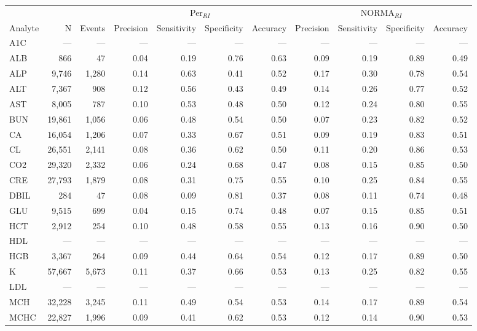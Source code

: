 \begin{table}[ht]
\centering
\footnotesize
\begin{tabular}{lrrrrrrrrrr}
\toprule
 & &  & \multicolumn{4}{c}{Per$_{RI}$} & \multicolumn{4}{c}{NORMA$_{RI}$} \\
\cmidrule(lr){4-7} \cmidrule(lr){8-11}
Analyte & N & Events & Precision & Sensitivity & Specificity & Accuracy & Precision & Sensitivity & Specificity & Accuracy \\
\midrule
A1C & --- & --- & --- & --- & --- & --- & --- & --- & --- & --- \\
ALB & 866 & 47 & 0.04 & 0.19 & 0.76 & 0.63 & 0.09 & 0.19 & 0.89 & 0.49 \\
ALP & 9,746 & 1,280 & 0.14 & 0.63 & 0.41 & 0.52 & 0.17 & 0.30 & 0.78 & 0.54 \\
ALT & 7,367 & 908 & 0.12 & 0.56 & 0.43 & 0.49 & 0.14 & 0.26 & 0.77 & 0.52 \\
AST & 8,005 & 787 & 0.10 & 0.53 & 0.48 & 0.50 & 0.12 & 0.24 & 0.80 & 0.55 \\
BUN & 19,861 & 1,056 & 0.06 & 0.48 & 0.54 & 0.50 & 0.07 & 0.23 & 0.82 & 0.52 \\
CA & 16,054 & 1,206 & 0.07 & 0.33 & 0.67 & 0.51 & 0.09 & 0.19 & 0.83 & 0.51 \\
CL & 26,551 & 2,141 & 0.08 & 0.36 & 0.62 & 0.50 & 0.11 & 0.20 & 0.86 & 0.53 \\
CO2 & 29,320 & 2,332 & 0.06 & 0.24 & 0.68 & 0.47 & 0.08 & 0.15 & 0.85 & 0.50 \\
CRE & 27,793 & 1,879 & 0.08 & 0.31 & 0.75 & 0.55 & 0.10 & 0.25 & 0.84 & 0.55 \\
DBIL & 284 & 47 & 0.08 & 0.09 & 0.81 & 0.37 & 0.08 & 0.11 & 0.74 & 0.48 \\
GLU & 9,515 & 699 & 0.04 & 0.15 & 0.74 & 0.48 & 0.07 & 0.15 & 0.85 & 0.51 \\
HCT & 2,912 & 254 & 0.10 & 0.48 & 0.58 & 0.55 & 0.13 & 0.16 & 0.90 & 0.50 \\
HDL & --- & --- & --- & --- & --- & --- & --- & --- & --- & --- \\
HGB & 3,367 & 264 & 0.09 & 0.44 & 0.64 & 0.54 & 0.12 & 0.17 & 0.89 & 0.50 \\
K & 57,667 & 5,673 & 0.11 & 0.37 & 0.66 & 0.53 & 0.13 & 0.25 & 0.82 & 0.55 \\
LDL & --- & --- & --- & --- & --- & --- & --- & --- & --- & --- \\
MCH & 32,228 & 3,245 & 0.11 & 0.49 & 0.54 & 0.53 & 0.14 & 0.17 & 0.89 & 0.54 \\
MCHC & 22,827 & 1,996 & 0.09 & 0.41 & 0.62 & 0.53 & 0.12 & 0.14 & 0.90 & 0.53 \\

\end{tabular}
\end{table}
